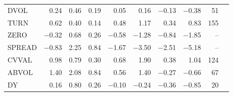 \begin{tabular}{l rrr rr rr r c}
DVOL & 0.24 & 0.46 & 0.19 & 0.05 & 0.16 & $-$0.13 & $-$0.38 & 51 &  \\
TURN & 0.62 & 0.40 & 0.14 & 0.48 & 1.17 & 0.34 & 0.83 & 155 &  \\
ZERO & $-$0.32 & 0.68 & 0.26 & $-$0.58 & $-$1.28 & $-$0.84 & $-$1.85 & -- &  \\
SPREAD & $-$0.83 & 2.25 & 0.84 & $-$1.67 & $-$3.50 & $-$2.51 & $-$5.18 & -- &  \\
CVVAL & 0.98 & 0.79 & 0.30 & 0.68 & 1.90 & 0.38 & 1.04 & 124 &  \\
ABVOL & 1.40 & 2.08 & 0.84 & 0.56 & 1.40 & $-$0.27 & $-$0.66 & 67 &  \\
\addlinespace[2pt]
DY & 0.16 & 0.80 & 0.26 & $-$0.10 & $-$0.24 & $-$0.36 & $-$0.85 & 20 &  \\
\bottomrule
\end{tabular}